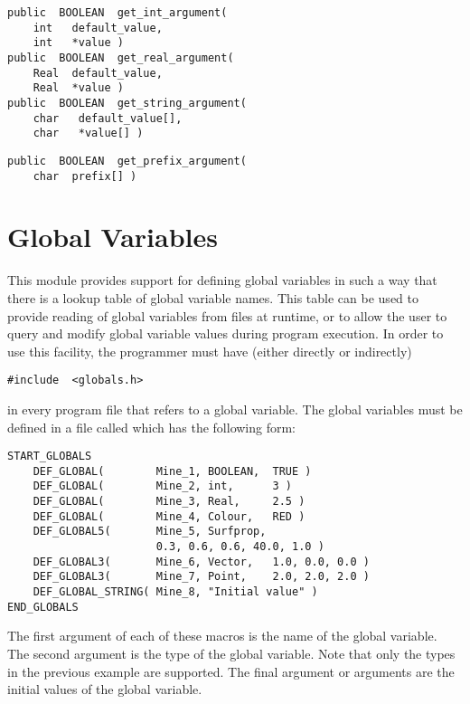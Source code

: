 {\bf\begin{verbatim}
public  BOOLEAN  get_int_argument(
    int   default_value,
    int   *value )
public  BOOLEAN  get_real_argument(
    Real  default_value,
    Real  *value )
public  BOOLEAN  get_string_argument(
    char   default_value[],
    char   *value[] )
\end{verbatim}}


{\bf\begin{verbatim}
public  BOOLEAN  get_prefix_argument(
    char  prefix[] )
\end{verbatim}}


\section{Global Variables}

This module provides support for defining global variables in such a
way that there is a lookup table of global variable names.  This table
can be used to provide reading of global variables from files at
runtime, or to allow the user to query and modify global variable
values during program execution.  In order to use this facility, the
programmer must have (either directly or indirectly)
{\bf\begin{verbatim}
#include  <globals.h>
\end{verbatim}}
in every program file that refers to a global variable.  The
global variables must be defined in a file called
 which has the following form:
{\bf\begin{verbatim}
START_GLOBALS
    DEF_GLOBAL(        Mine_1, BOOLEAN,  TRUE )
    DEF_GLOBAL(        Mine_2, int,      3 )
    DEF_GLOBAL(        Mine_3, Real,     2.5 )
    DEF_GLOBAL(        Mine_4, Colour,   RED )
    DEF_GLOBAL5(       Mine_5, Surfprop,
                       0.3, 0.6, 0.6, 40.0, 1.0 )
    DEF_GLOBAL3(       Mine_6, Vector,   1.0, 0.0, 0.0 )
    DEF_GLOBAL3(       Mine_7, Point,    2.0, 2.0, 2.0 )
    DEF_GLOBAL_STRING( Mine_8, "Initial value" )
END_GLOBALS
\end{verbatim}}
The first argument of each of these macros is the name of the global
variable.  The second argument is the type of the global variable.
Note that only the types in the previous example are supported.  The
final argument or arguments are the initial values of the global
variable.

